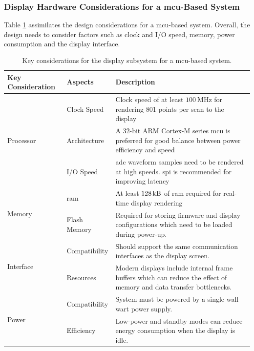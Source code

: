 \documentclass[class=report,11pt,crop=false]{standalone}
\begin{document}
	
	\subsubsection{Display Hardware Considerations for a \acrshort{mcu}-Based System}
	
	Table \ref{tab:mcu-display-options} assimilates the design considerations for a \acrshort{mcu}-based system. Overall, the design needs to consider factors such as clock and I/O speed, memory, power consumption and the display interface.
	
	\begin{table}[ht!]
		\centering
		\begin{tabular}{|m{5em}|m{10em}|m{24em}|}
			\hline
			\cellcolor{cyan!25}\textbf{Key Consideration}	&	\cellcolor{cyan!25}\textbf{Aspects}	& \cellcolor{cyan!25}\textbf{Description}\\
			\hline
			\multirow{3}{*}{Processor}	& Clock Speed	& Clock speed of at least $\SI{100}{\mega\hertz}$ for rendering 801 points per scan to the display\\
			\cline{2-3}
			&	Architecture &	A 32-bit ARM Cortex-M series \acrshort{mcu} is preferred for good balance between power efficiency and speed\\
			\cline{2-3}
			&	I/O Speed & \acrshort{adc} waveform samples need to be rendered at high speeds. \acrshort{spi} is recommended for improving latency\\
			\hline
			\multirow{2}{*}{Memory}	& 	\acrshort{ram}	& At least $\SI{128}{\kilo\byte}$ of \acrshort{ram} required for real-time display rendering\\
			\cline{2-3}
			&	Flash Memory	&	Required for storing firmware and display configurations which need to be loaded during power-up.\\
			\hline
			\multirow{2}{*}{Interface}	&	Compatibility	& Should support the same communication interfaces as the display screen.\\
			\cline{2-3}
			&	Resources &	Modern displays include internal frame buffers which can reduce the effect of memory and data transfer bottlenecks.\\
			\hline
			\multirow{2}{*}{Power}	&	Compatibility & System must be powered by a single wall wart power supply.\\
			\cline{2-3}
			&	Efficiency	&	Low-power and standby modes can reduce energy consumption when the display is idle.\\
			\hline
		\end{tabular}
		\caption{Key considerations for the display subsystem for a \acrshort{mcu}-based system.}
		\label{tab:mcu-display-options}
	\end{table}
	
\end{document}
